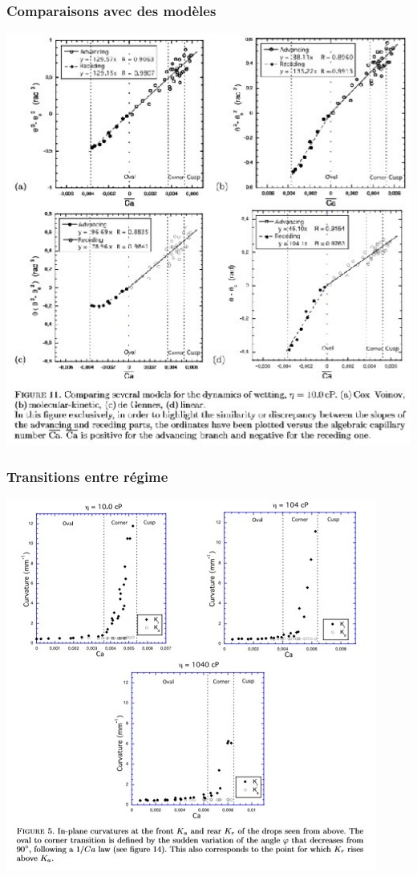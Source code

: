 \documentclass{beamer}
\begin{document}
\begin{frame}
\frametitle{Comparaisons avec des modèles}
\centering
\includegraphics[scale = 0.5]{Modeles.jpg}
\end{frame}


\begin{frame}
\frametitle{Transitions entre régime}
\centering
\includegraphics[scale = 0.6]{Transition.jpg}
\end{frame}
\end{document}
